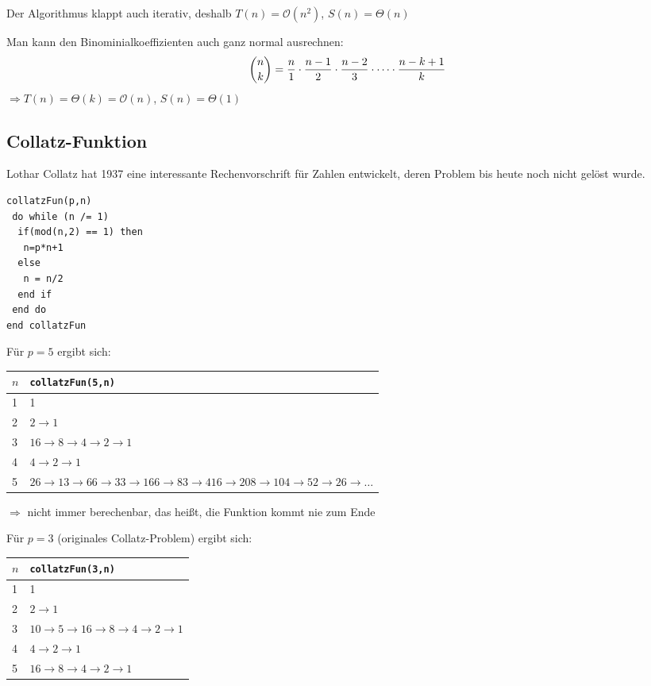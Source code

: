 Der Algorithmus klappt auch iterativ, deshalb $T(n)=\mathcal{O}(n^2)$, $S(n)=\Theta(n)$

Man kann den Binominialkoeffizienten auch ganz normal ausrechnen:
\begin{align}
	\binom{n}{k}=\frac{n}{1}\cdot\frac{n-1}{2}\cdot\frac{n-2}{3}\cdot\dots\cdot\frac{n-k+1}{k}\notag
\end{align}
$\Rightarrow T(n)=\Theta(k)=\mathcal{O}(n)$, $S(n)=\Theta(1)$

\subsection{Collatz-Funktion}

Lothar Collatz hat 1937 eine interessante Rechenvorschrift für Zahlen entwickelt, deren Problem bis heute noch nicht gelöst wurde.

\begin{lstlisting}
collatzFun(p,n)
 do while (n /= 1)
  if(mod(n,2) == 1) then
   n=p*n+1
  else
   n = n/2
  end if
 end do
end collatzFun
\end{lstlisting}

Für $p=5$ ergibt sich:
\begin{center}
	\begin{tabular}{l|p{7cm}}
		\rowcolor{lightgray} \textbf{$n$} & \texttt{collatzFun(5,n)} \\
		\hline
		1 & 1 \\
		2 & $2\to 1$ \\
		3 & $16\to 8\to 4\to 2\to 1$ \\
		4 & $4\to 2\to 1$ \\
		5 & $26\to 13\to 66\to 33\to 166\to 83\to 416\to 208\to 104\to 52\to 26\to\dots$
	\end{tabular}
\end{center}
$\Rightarrow$ nicht immer berechenbar, das heißt, die Funktion kommt nie zum Ende

Für $p=3$ (originales Collatz-Problem) ergibt sich:
\begin{center}
	\begin{tabular}{l|p{7cm}}
		\rowcolor{lightgray} \textbf{$n$} & \texttt{collatzFun(3,n)} \\
		\hline
		1 & 1 \\
		2 & $2\to 1$ \\
		3 & $10\to 5\to 16\to 8\to 4\to 2\to 1$ \\
		4 & $4\to 2\to 1$ \\
		5 & $16\to 8\to 4\to 2\to 1$
	\end{tabular}
\end{center}


